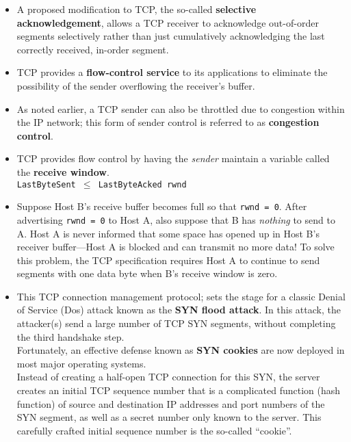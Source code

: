 \begin{itemize}
\item
A proposed modification to TCP, the so-called \textbf{selective acknowledgement}, allows a TCP receiver to acknowledge out-of-order segments selectively rather than just cumulatively acknowledging the last correctly received, in-order segment.

\item
TCP provides a \textbf{flow-control service} to its applications to eliminate the possibility of the sender overflowing the receiver's buffer.

\item
As noted earlier, a TCP sender can also be throttled due to congestion within the IP network; this form of sender control is referred to as \textbf{congestion control}.

\item
TCP provides flow control by having the \textit{sender} maintain a variable called the \textbf{receive window}.\\
\hspace*{1em}\texttt{LastByteSent $\leq$ LastByteAcked rwnd}

\item
Suppose Host B's receive buffer becomes full so that \texttt{rwnd = 0}. After advertising \texttt{rwnd = 0} to Host A, also suppose that B has \textit{nothing} to send to A. Host A is never informed that some space has opened up in Host B's receiver buffer---Host A is blocked and can transmit no more data! To solve this problem, the TCP specification requires Host A to continue to send segments with one data byte when B's receive window is zero.

\item
This TCP connection management protocol; sets the stage for a classic Denial of Service (Dos) attack known as the \textbf{SYN flood attack}. In this attack, the attacker(s) send a large number of TCP SYN segments, without completing the third handshake step.\\
Fortunately, an effective defense known as \textbf{SYN cookies} are now deployed in most major operating systems.\\
Instead of creating a half-open TCP connection for this SYN, the server creates an initial TCP sequence number that is a complicated function (hash function) of source and destination IP addresses and port numbers of the SYN segment, as well as a secret number only known to the server. This carefully crafted initial sequence number is the so-called ``cookie''.


\end{itemize}
